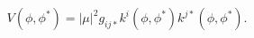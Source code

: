 \begin{equation}
V(\phi, \phi^*)=|\mu|^2 g_{ij*}k^i(\phi, \phi^*) k^{j*}(\phi, \phi^*) .
 \label{sherk}
\end{equation}

